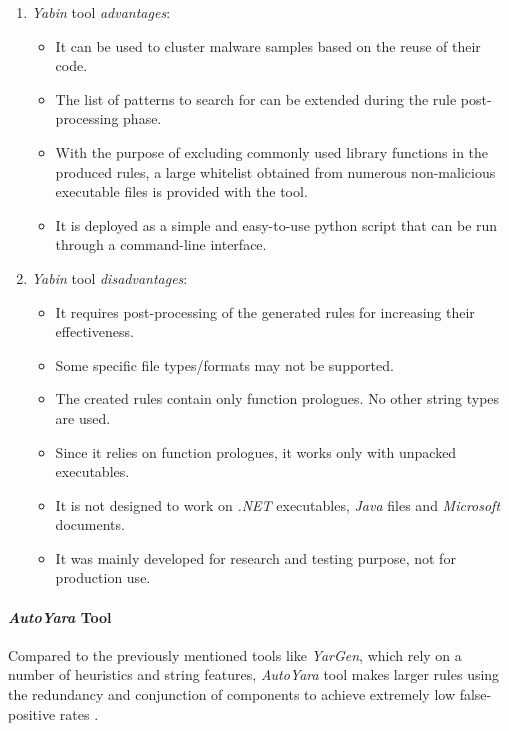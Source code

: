 \documentclass[pdfa%
,cucitura%
]{toptesi}
\begin{document}
\begin{enumerate}
	\item \textit{Yabin} tool \textit{advantages}:
	\begin{itemize}
		\item It can be used to cluster malware samples based on the reuse of their code.
		
		\item The list of patterns to search for can be extended during the rule post-processing phase.
		
		\item With the purpose of excluding commonly used library functions in the produced rules, a large whitelist obtained from numerous non-malicious executable files is provided with the tool.
		
		\item It is deployed as a simple and easy-to-use python script that can be run through a command-line interface.
	\end{itemize}
	
	\item \textit{Yabin} tool \textit{disadvantages}:
	\begin{itemize}
		\item It requires post-processing of the generated rules for increasing their effectiveness.
		
		\item Some specific file types/formats may not be supported.
		
		\item The created rules contain only function prologues. No other string types are used.
		
		\item Since it relies on function prologues, it works only with unpacked executables.
		
		\item It is not designed to work on \textit{.NET} executables, \textit{Java} files and \textit{Microsoft} documents.
		
		\item It was mainly developed for research and testing purpose, not for production use.
	\end{itemize}
\end{enumerate}

\paragraph{\textit{AutoYara} Tool}
Compared to the previously mentioned tools like \textit{YarGen}, which rely on a number of heuristics and string features, \textit{AutoYara} tool makes larger rules using the redundancy and conjunction of components to achieve extremely low false-positive rates \cite{RaffAYRGUB}.
\end{document}

